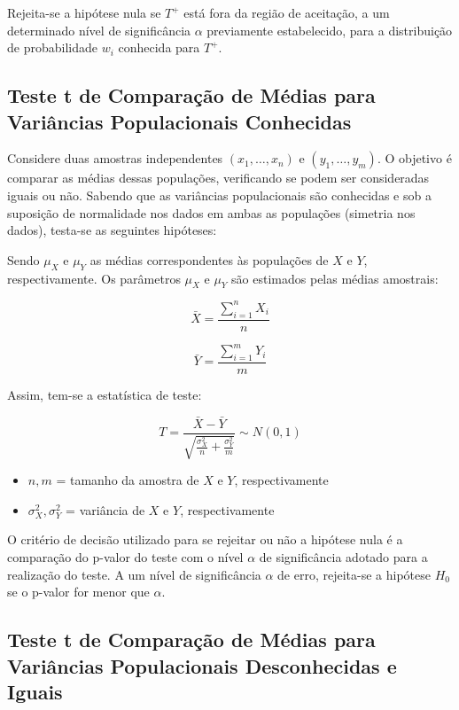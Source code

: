 \documentclass[
  portuguese,
]{estat/estat}
\providecommand{\tightlist}{%
  \setlength{\itemsep}{0pt}\setlength{\parskip}{0pt}}
\begin{document}
Rejeita-se a hipótese nula se \(T^+\) está fora da região de aceitação,
a um determinado nível de significância \(\alpha\) previamente
estabelecido, para a distribuição de probabilidade \(w_i\) conhecida
para \(T^+\).

\subsection{Teste t de Comparação de Médias para Variâncias
Populacionais
Conhecidas}\label{teste-t-de-comparauxe7uxe3o-de-muxe9dias-para-variuxe2ncias-populacionais-conhecidas}

Considere duas amostras independentes \((x_1, \ldots, x_n)\) e
\((y_1, \ldots, y_m)\). O objetivo é comparar as médias dessas
populações, verificando se podem ser consideradas iguais ou não. Sabendo
que as variâncias populacionais são conhecidas e sob a suposição de
normalidade nos dados em ambas as populações (simetria nos dados),
testa-se as seguintes hipóteses:


Sendo \(\mu_X\) e \(\mu_Y\) as médias correspondentes às populações de
\(X\) e \(Y\), respectivamente. Os parâmetros \(\mu_X\) e \(\mu_Y\) são
estimados pelas médias amostrais:

\[
\bar{X} = \frac{\sum_{i=1}^{n} X_i}{n}
\]

\[
\bar{Y} = \frac{\sum_{i=1}^{m} Y_i}{m}
\]

Assim, tem-se a estatística de teste:

\[
T = \frac{\bar{X} - \bar{Y}}{\sqrt{\frac{\sigma^2_{X}}{n} + \frac{\sigma^2_{Y}}{m}}} \sim N(0,1)
\]

\begin{itemize}
\tightlist
\item
  \(n, m\) = tamanho da amostra de \(X\) e \(Y\), respectivamente
\item
  \(\sigma_X^2, \sigma_Y^2\) = variância de \(X\) e \(Y\),
  respectivamente
\end{itemize}

O critério de decisão utilizado para se rejeitar ou não a hipótese nula
é a comparação do p-valor do teste com o nível \(\alpha\) de
significância adotado para a realização do teste. A um nível de
significância \(\alpha\) de erro, rejeita-se a hipótese \(H_{0}\) se o
p-valor for menor que \(\alpha\).

\subsection{Teste t de Comparação de Médias para Variâncias
Populacionais Desconhecidas e
Iguais}\label{teste-t-de-comparauxe7uxe3o-de-muxe9dias-para-variuxe2ncias-populacionais-desconhecidas-e-iguais}
\end{document}

